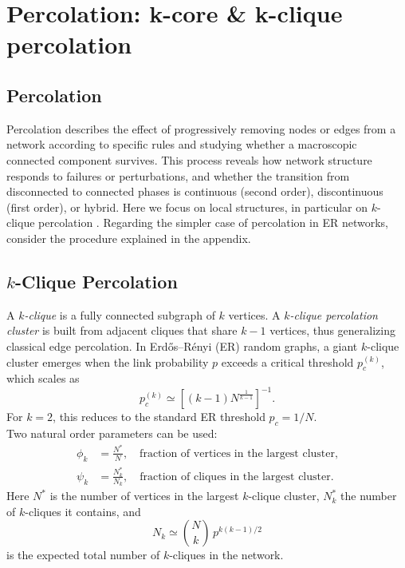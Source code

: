 \chapter{Percolation: k-core \& k-clique percolation}


\section{Percolation}
Percolation describes the effect of progressively removing nodes or edges 
from a network according to specific rules and studying whether a 
macroscopic connected component survives. 
This process reveals how network structure responds to failures or 
perturbations, and whether the transition from disconnected to connected 
phases is continuous (second order), discontinuous (first order), 
or hybrid. 
Here we focus on local structures, in particular on $k$-clique percolation \cite{derenyi2005clique}.
Regarding the simpler case of percolation in ER networks, consider the procedure explained in the appendix.

\section{$k$-Clique Percolation}
A \emph{$k$-clique} is a fully connected subgraph of $k$ vertices. 
A \emph{$k$-clique percolation cluster} is built from adjacent cliques 
that share $k-1$ vertices, thus generalizing classical edge percolation. 
In Erdős–Rényi (ER) random graphs, a giant $k$-clique cluster emerges 
when the link probability $p$ exceeds a critical threshold $p_c^{(k)}$, 
which scales as
\begin{equation}
    p_c^{(k)} \simeq \left[(k-1)N^{\tfrac{1}{k-1}}\right]^{-1}.
\end{equation}
For $k=2$, this reduces to the standard ER threshold $p_c = 1/N$.\\
Two natural order parameters can be used:
\begin{align}
    \phi_k &= \frac{N^{*}}{N}, \quad \text{fraction of vertices in the largest cluster,} \\
    \psi_k &= \frac{N_k^{*}}{N_k}, \quad \text{fraction of cliques in the largest cluster.}
\end{align}
Here $N^{*}$ is the number of vertices in the largest $k$-clique cluster, 
$N_k^{*}$ the number of $k$-cliques it contains, and 
\begin{equation}
    N_k \simeq \binom{N}{k} \, p^{k(k-1)/2}
\end{equation}
is the expected total number of $k$-cliques in the network.

